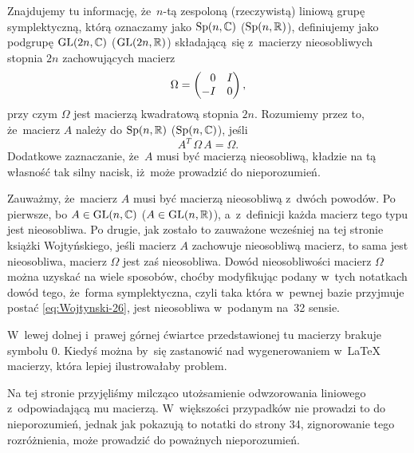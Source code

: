 \documentclass[a4paper,11pt]{article}
\numberwithin{equation}{section}
\begin{document}
\noindent
{} Znajdujemy tu informację, że~$n$-tą zespoloną
(rzeczywistą) liniową grupę symplektyczną, którą oznaczamy jako
$\mathrm{Sp}( n, \mathbb{C} )$ ($\mathrm{Sp}( n, \mathbb{R} )$), definiujemy jako podgrupę
$\mathrm{GL}( 2n, \mathbb{C} )$ ($\mathrm{GL}( 2n, \mathbb{R} )$) składającą~się z~macierzy
nieosobliwych stopnia $2n$ zachowujących macierz
\begin{equation}
  \label{eq:Wojtynski-28}
  \Omega =
  \begin{pmatrix}
    \hphantom{-} 0 & I \\
    -I & 0
  \end{pmatrix},
\end{equation}
przy czym $\Omega$ jest macierzą kwadratową stopnia $2n$. Rozumiemy przez to,
że~macierz $A$ należy do $\mathrm{Sp}( n, \mathbb{R} )$ ($\mathrm{Sp}( n, \mathbb{C} )$), jeśli
\begin{equation}
  \label{eq:Wojtynski-29}
  A^{ T } \, \Omega \, A = \Omega.
\end{equation}
Dodatkowe zaznaczanie, że~$A$ musi być macierzą nieosobliwą, kładzie na tą
własność tak silny nacisk, iż~może prowadzić do nieporozumień.

Zauważmy, że~macierz $A$ musi być macierzą nieosobliwą z~dwóch powodów. Po
pierwsze, bo $A \in \mathrm{GL}( n, \mathbb{C})$ ($A \in \mathrm{GL}( n, \mathbb{R} )$), a~z~definicji
każda macierz tego typu jest nieosobliwa. Po drugie, jak zostało to
zauważone wcześniej na tej stronie książki Wojtyńskiego, jeśli macierz $A$
zachowuje nieosobliwą macierz, to sama jest nieosobliwa, macierz $\Omega$ jest
zaś nieosobliwa. Dowód nieosobliwości macierz $\Omega$ można uzyskać na wiele
sposobów, choćby modyfikując podany w~tych notatkach dowód tego, że~forma
symplektyczna, czyli taka która w~pewnej bazie przyjmuje postać
\eqref{eq:Wojtynski-26}, jest nieosobliwa w~podanym na~32 sensie.

\VerSpaceFour





\noindent
{} W~lewej dolnej i~prawej górnej ćwiartce przedstawionej tu
macierzy brakuje symbolu $0$. Kiedyś można by~się zastanowić nad
wygenerowaniem w~\LaTeX{} macierzy, która lepiej ilustrowałaby problem.

\VerSpaceFour





\noindent
{} Na tej stronie przyjęliśmy milcząco utożsamienie odwzorowania
liniowego z~odpowiadającą mu macierzą. W~większości przypadków nie prowadzi
to do nieporozumień, jednak jak pokazują to notatki do strony 34,
zignorowanie tego rozróżnienia, może prowadzić do poważnych nieporozumień.
\end{document}
